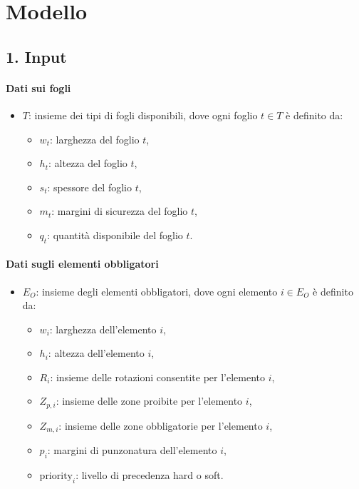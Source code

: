 \section{Modello}

\subsection*{1. Input}

\paragraph{Dati sui fogli}  
\begin{itemize}
    \item \( T \): insieme dei tipi di fogli disponibili, dove ogni foglio \( t \in T \) è definito da:
    \begin{itemize}
        \item \( w_t \): larghezza del foglio \( t \),
        \item \( h_t \): altezza del foglio \( t \),
        \item \( s_t \): spessore del foglio \( t \),
        \item \( m_t \): margini di sicurezza del foglio \( t \),
        \item \( q_t \): quantità disponibile del foglio \( t \).
    \end{itemize}
\end{itemize}

\paragraph{Dati sugli elementi obbligatori}  
\begin{itemize}
    \item \( E_O \): insieme degli elementi obbligatori, dove ogni elemento \( i \in E_O \) è definito da:
    \begin{itemize}
        \item \( w_i \): larghezza dell’elemento \( i \),
        \item \( h_i \): altezza dell’elemento \( i \),
        \item \( R_i \): insieme delle rotazioni consentite per l’elemento \( i \),
        \item \( Z_{p,i} \): insieme delle zone proibite per l’elemento \( i \),
        \item \( Z_{m,i} \): insieme delle zone obbligatorie per l’elemento \( i \),
        \item \( p_i \): margini di punzonatura dell’elemento \( i \),
        \item \( \text{priority}_i \): livello di precedenza hard o soft.
    \end{itemize}
\end{itemize}

